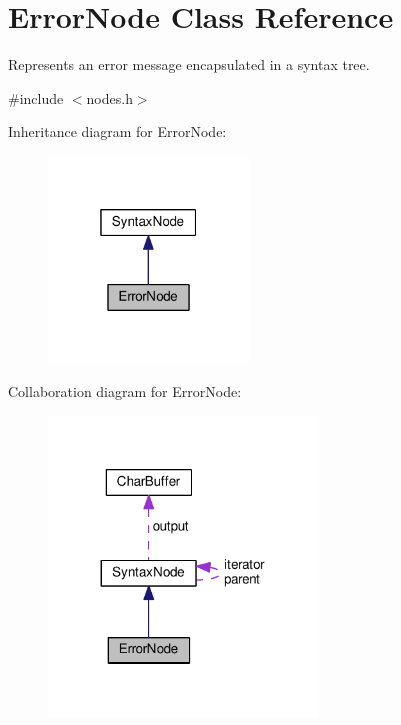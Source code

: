 \hypertarget{classErrorNode}{}\section{Error\+Node Class Reference}
\label{classErrorNode}


Represents an error message encapsulated in a syntax tree.  




{\ttfamily \#include $<$nodes.\+h$>$}



Inheritance diagram for Error\+Node\+:
\nopagebreak
\begin{figure}[H]
\begin{center}
\leavevmode
\includegraphics[width=151pt]{de/da4/classErrorNode__inherit__graph}
\end{center}
\end{figure}


Collaboration diagram for Error\+Node\+:
\nopagebreak
\begin{figure}[H]
\begin{center}
\leavevmode
\includegraphics[width=203pt]{d1/d7f/classErrorNode__coll__graph}
\end{center}
\end{figure}
